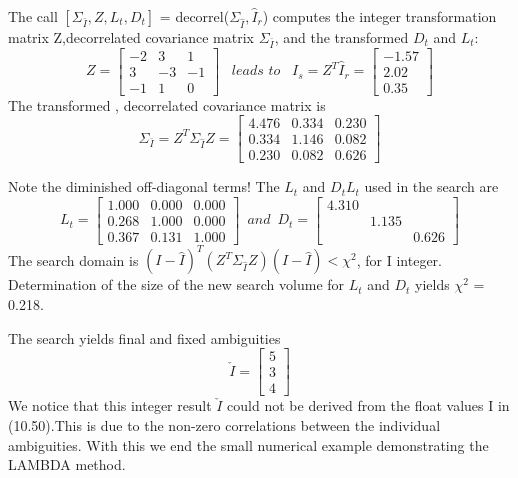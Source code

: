 The call $[\Sigma_{\bar{I}},Z,L_{t},D_{t}]$ = decorrel($\Sigma_{\hat{I}},\hat{I}_{r}$) computes the integer transformation matrix Z,decorrelated covariance matrix $\Sigma_{\bar{I}}$, and the transformed $D_{t}$ and $L_{t}$:
\begin{equation}
Z=
\begin{bmatrix}
-2&3&1\\
3&-3&-1\\
-1&1&0
\end{bmatrix}\,\,\,\,\,
leads\,\,to\,\,\,\,\,
I_{s}=Z^{T}\hat{I}_{r}=
\begin{bmatrix}
-1.57\\2.02\\0.35
\end{bmatrix}
\end{equation}
The transformed , decorrelated covariance matrix is
\begin{equation}
\Sigma_{\bar{I}}=Z^{T}\Sigma_{\hat{I}}Z=
\begin{bmatrix}
4.476&0.334&0.230\\
0.334&1.146&0.082\\
0.230&0.082&0.626
\end{bmatrix}
\end{equation}

Note the diminished off-diagonal terms! The $L_{t}$ and $D_{t}$$L_{t}$ used in the search are
$$
L_{t}=
\begin{bmatrix}
1.000&0.000&0.000\\
0.268&1.000&0.000\\
0.367&0.131&1.000
\end{bmatrix}\,\,\,
and \,\,\,
D_{t}=
\begin{bmatrix}
4.310&&\\
&1.135&\\
&&0.626
\end{bmatrix}
$$
The search domain is $
(I-\hat{I})^{T}(Z^{T}\Sigma_{\hat{I}}Z)(I-\hat{I})<\chi^{2}
$, for I integer. Determination of the size of the new search volume for $L_{t}$ and $D_{t}$ yields $\chi^{2}$ = 0.218.

The search yields final and fixed ambiguities
$$
\check{I}=
\begin{bmatrix}
5\\3\\4
\end{bmatrix}
$$
We notice that this integer result $\check{I}$ could not be derived from the float values I in (10.50).This is due to the non-zero correlations between the individual ambiguities. With this we end the small numerical example demonstrating the LAMBDA method.

